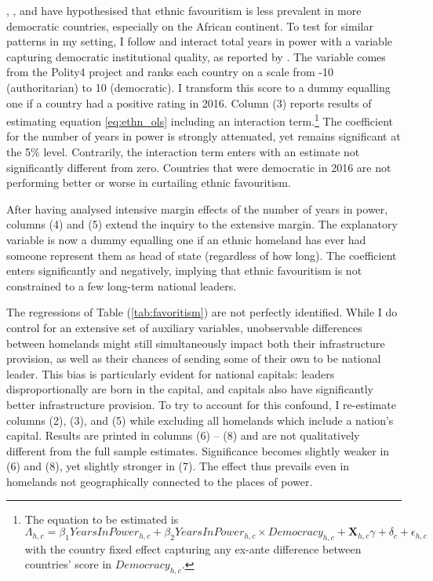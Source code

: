 \documentclass[11pt, oneside]{article}   	%
\let\oldref\ref
\renewcommand{\ref}[1]{(\oldref{#1})}
\begin{document}
\cite{DeLuca_Ethnicfavoritismaxiom_2018}, \cite{Hodler_RegionalFavoritism_2014}, and \cite{burgess_value_2015} have hypothesised that ethnic favouritism is less prevalent in more democratic countries, especially on the African continent. To test for similar patterns in my setting, I follow \citeauthor{DeLuca_Ethnicfavoritismaxiom_2018} and interact total years in power with a variable capturing democratic institutional quality, as reported by \cite{Marshall_PolityProjectCenter_2015}. The variable comes from the Polity4 project and ranks each country on a scale from -10 (authoritarian) to 10 (democratic). I transform this score to a dummy equalling one if a country had a positive rating in 2016. Column (3) reports results of estimating equation \eqref{eq:ethn_ols} including an interaction term.\footnote{The equation to be estimated is \begin{equation*}
  \Lambda_{h,c} = \beta_{1} YearsInPower_{h,c} + \beta_{2} YearsInPower_{h,c}\times Democracy_{h,c} + \textbf{X}_{h,c}\gamma + \delta_{c} + \epsilon_{h,c}
\end{equation*} with the country fixed effect capturing any ex-ante difference between countries' score in $Democracy_{h,c}$.} The coefficient for the number of years in power is strongly attenuated, yet remains significant at the 5\% level. Contrarily, the interaction term enters with an estimate not significantly different from zero. Countries that were democratic in 2016 are not performing better or worse in curtailing ethnic favouritism.

After having analysed intensive margin effects of the number of years in power, columns (4) and (5) extend the inquiry to the extensive margin. The explanatory variable is now a dummy equalling one if an ethnic homeland has ever had someone represent them as head of state (regardless of how long). The coefficient enters significantly and negatively, implying that ethnic favouritism is not constrained to a few long-term national leaders.

The regressions of Table \ref{tab:favoritism} are not perfectly identified. While I do control for an extensive set of auxiliary variables, unobservable differences between homelands might still simultaneously impact both their infrastructure provision, as well as their chances of sending some of their own to be national leader. This bias is particularly evident for national capitals: leaders disproportionally are born in the capital, and capitals also have significantly better infrastructure provision. To try to account for this confound, I re-estimate columns (2), (3), and (5) while excluding all homelands which include a nation's capital. Results are printed in columns (6) -- (8) and are not qualitatively different from the full sample estimates. Significance becomes slightly weaker in (6) and (8), yet slightly stronger in (7). The effect thus prevails even in homelands not geographically connected to the places of power.
\end{document}
